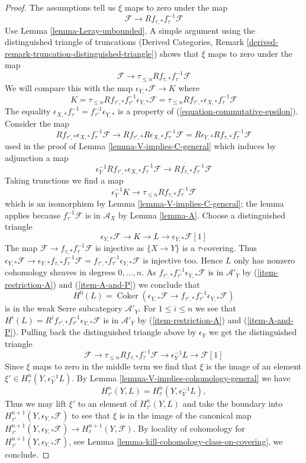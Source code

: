 \documentclass[10pt,a4paper]{amsart}
\theoremstyle{plain}
\theoremstyle{definition}
\theoremstyle{remark}
\numberwithin{equation}{subsection}
\def\Coker{\mathop{\mathrm{Coker}}}
\begin{document}
\begin{proof}
\medskip\noindent
The assumptions tell us $\xi$ maps to zero under the map
$$
\mathcal{F} \longrightarrow Rf_{\tau, *}f_\tau^{-1}\mathcal{F}
$$
Use Lemma \ref{lemma-Leray-unbounded}.
A simple argument using the distinguished triangle of truncations
(Derived Categories, Remark
\ref{derived-remark-truncation-distinguished-triangle}) shows that
$\xi$ maps to zero under the map
$$
\mathcal{F} \longrightarrow \tau_{\leq n}Rf_{\tau, *}f_\tau^{-1}\mathcal{F}
$$
We will compare this with the map $\epsilon_{Y, *}\mathcal{F} \to K$
where
$$
K = \tau_{\leq n}Rf_{\tau', *}f_{\tau'}^{-1}\epsilon_{Y, *}\mathcal{F} =
\tau_{\leq n}Rf_{\tau', *}\epsilon_{X, *}f_{\tau}^{-1}\mathcal{F}
$$
The equality
$\epsilon_{X, *} f_\tau^{-1} = f_{\tau'}^{-1} \epsilon_{Y, *}$
is a property of (\ref{equation-commutative-epsilon}). Consider the map
$$
Rf_{\tau', *}\epsilon_{X, *}f_{\tau}^{-1}\mathcal{F} \longrightarrow
Rf_{\tau', *}R\epsilon_{X, *}f_{\tau}^{-1}\mathcal{F} =
R\epsilon_{Y, *}Rf_{\tau, *}f_\tau^{-1}\mathcal{F}
$$
used in the proof of Lemma \ref{lemma-V-implies-C-general}
which induces by adjunction a map
$$
\epsilon_Y^{-1} Rf_{\tau', *}\epsilon_{X, *}f_{\tau}^{-1}\mathcal{F} \to
Rf_{\tau, *}f_\tau^{-1}\mathcal{F}
$$
Taking trunctions we find a map
$$
\epsilon_Y^{-1}K
\longrightarrow
\tau_{\leq n}Rf_{\tau, *}f_\tau^{-1}\mathcal{F}
$$
which is an isomorphism by Lemma \ref{lemma-V-implies-C-general};
the lemma applies because $f_\tau^{-1}\mathcal{F}$ is in $\mathcal{A}_X$
by Lemma \ref{lemma-A}. Choose a distinguished triangle
$$
\epsilon_{Y, *}\mathcal{F} \to K \to L \to \epsilon_{Y, *}\mathcal{F}[1]
$$
The map $\mathcal{F} \to f_{\tau, *}f_\tau^{-1}\mathcal{F}$
is injective as $\{X \to Y\}$ is a $\tau$-covering. Thus
$\epsilon_{Y, *}\mathcal{F} \to
\epsilon_{Y, *}f_{\tau, *}f_\tau^{-1}\mathcal{F} =
f_{\tau', *}f_{\tau'}^{-1}\epsilon_{Y, *}\mathcal{F}$
is injective too. 
Hence $L$ only has nonzero cohomology sheaves in degrees $0, \ldots, n$.
As $f_{\tau', *}f_{\tau'}^{-1}\epsilon_{Y, *}\mathcal{F}$
is in $\mathcal{A}'_Y$ by (\ref{item-restriction-A}) and
(\ref{item-A-and-P}) we conclude that
$$
H^0(L) = \Coker(\epsilon_{Y, *}\mathcal{F} \to
f_{\tau', *}f_{\tau'}^{-1}\epsilon_{Y, *}\mathcal{F})
$$
is in the weak Serre subcategory $\mathcal{A}'_Y$. For $1 \leq i \leq n$
we see that $H^i(L) = R^if_{\tau', *}f_{\tau'}^{-1}\epsilon_{Y, *}\mathcal{F}$
is in $\mathcal{A}'_Y$ by (\ref{item-restriction-A}) and
(\ref{item-A-and-P}). Pulling back the distinguished triangle
above by $\epsilon_Y$ we get the distinguished triangle
$$
\mathcal{F} \to \tau_{\leq n}Rf_{\tau, *}f_\tau^{-1}\mathcal{F}
\to \epsilon_Y^{-1}L \to \mathcal{F}[1]
$$
Since $\xi$ maps to zero in the middle term we find
that $\xi$ is the image of an element
$\xi' \in H^n_\tau(Y, \epsilon_Y^{-1}L)$.
By Lemma \ref{lemma-V-implies-cohomology-general} we have
$$
H^n_{\tau'}(Y, L) = H^n_\tau(Y, \epsilon_Y^{-1}L),
$$
Thus we may lift $\xi'$ to an element of $H^n_{\tau'}(Y, L)$
and take the boundary into
$H^{n + 1}_{\tau'}(Y, \epsilon_{Y, *}\mathcal{F})$
to see that $\xi$ is in the image of the canonical map
$H^{n + 1}_{\tau'}(Y, \epsilon_{Y, *}\mathcal{F}) \to
H^{n + 1}_\tau(Y, \mathcal{F})$.
By locality of cohomology for
$H^{n + 1}_{\tau'}(Y,\epsilon_{Y, *}\mathcal{F})$, see
Lemma \ref{lemma-kill-cohomology-class-on-covering},
we conclude.
\end{proof}
\end{document}

